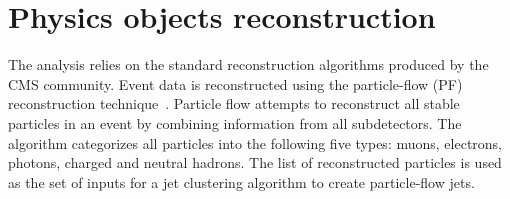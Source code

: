 \section{Physics objects reconstruction}
\label{sec:reco}
\label{sec:firstStep}
The analysis relies on the standard reconstruction algorithms 
produced by the CMS community.
Event data is reconstructed using the particle-flow (PF) reconstruction 
technique~\cite{pflow}. 
Particle flow attempts to reconstruct all stable particles in an event by 
combining information from all subdetectors. The algorithm categorizes all 
particles into the following five types: muons, electrons, photons, charged 
and neutral hadrons. The list of reconstructed particles is used as the set of
inputs for a jet clustering algorithm to create particle-flow jets.
